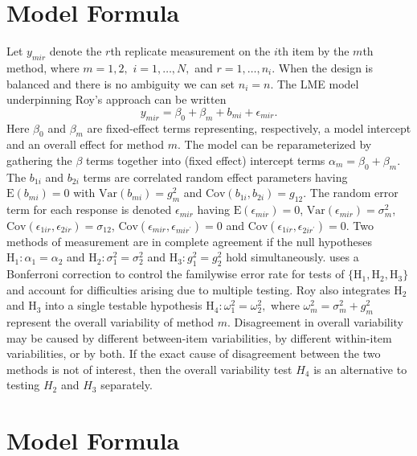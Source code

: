 \documentclass[12pt, a4paper]{report}
\theoremstyle{plain}
\theoremstyle{definition}
\theoremstyle{remark}
\begin{document}
\section{Model Formula}

Let $y_{mir} $ denote the $r$th replicate measurement on the $i$th item by the $m$th method, where $m=1,2,$ $i=1,\ldots,N,$ and $r = 1,\ldots,n_i.$ When the design is balanced and there is no ambiguity we can set $n_i=n.$ The LME model underpinning Roy's approach can be written
\begin{equation}\label{Roy-model}
y_{mir} = \beta_{0} + \beta_{m} + b_{mi} + \epsilon_{mir}.
\end{equation}
Here $\beta_0$ and $\beta_m$ are fixed-effect terms representing, respectively, a model intercept and an overall effect for method $m.$ The model can be reparameterized by gathering the $\beta$ terms together into (fixed effect) intercept terms $\alpha_m=\beta_0+\beta_m.$ The $b_{1i}$ and $b_{2i}$ terms are correlated random effect parameters having $\mathrm{E}(b_{mi})=0$ with $\mathrm{Var}(b_{mi})=g^2_m$ and $\mathrm{Cov}(b_{1i}, b_{2 i})=g_{12}.$ The random error term for each response is denoted $\epsilon_{mir}$ having $\mathrm{E}(\epsilon_{mir})=0$, $\mathrm{Var}(\epsilon_{mir})=\sigma^2_m$, $\mathrm{Cov}(\epsilon_{1ir}, \epsilon_{2 ir})=\sigma_{12}$, $\mathrm{Cov}(\epsilon_{mir}, \epsilon_{mir^\prime})= 0$ and $\mathrm{Cov}(\epsilon_{1ir}, \epsilon_{2 ir^\prime})= 0.$ Two methods of measurement are in complete agreement if the null hypotheses $\mathrm{H}_1\colon \alpha_1 = \alpha_2$ and $\mathrm{H}_2\colon \sigma^2_1 = \sigma^2_2 $ and $\mathrm{H}_3\colon g^2_1= g^2_2$ hold simultaneously. \citet{roy} uses a Bonferroni correction to control the familywise error rate for tests of $\{\mathrm{H}_1, \mathrm{H}_2, \mathrm{H}_3\}$ and account for difficulties arising due to multiple testing. Roy also integrates $\mathrm{H}_2$ and $\mathrm{H}_3$ into a single testable hypothesis $\mathrm{H}_4\colon \omega^2_1=\omega^2_2,$ where $\omega^2_m = \sigma^2_m + g^2_m$ represent the overall variability of method $m.$  Disagreement in overall variability may be caused by different between-item variabilities, by different within-item variabilities, or by both.  If the exact cause of disagreement between the two methods is not of interest, then the overall variability test $H_4$ is an alternative to testing $H_2$ and $H_3$ separately.

\section{Model Formula}
\end{document}
